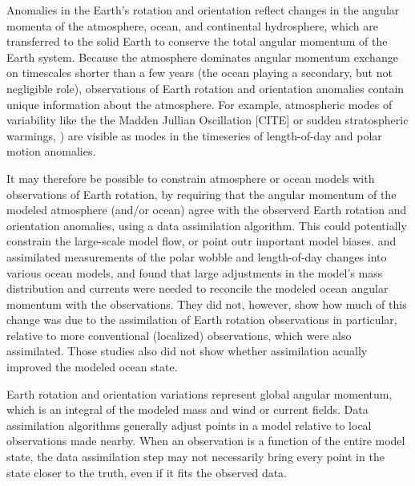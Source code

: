 
Anomalies in the Earth's rotation and orientation reflect changes in the angular momenta of the atmosphere, ocean, and continental hydrosphere, which are transferred to the solid Earth to conserve the total angular momentum of the Earth system. 
Because the atmosphere dominates angular momentum exchange on timescales shorter than a few years (the ocean playing a secondary, but  not negligible role), observations of Earth rotation and orientation anomalies contain unique information about the atmosphere.
For example, atmospheric modes of variability like the the Madden Jullian Oscillation \textcolor{alert}{[CITE]} or sudden stratospheric warmings, \citet{Neef2014}) are visible as modes in the timeseries of length-of-day and polar motion anomalies. 

It may therefore be possible to constrain atmosphere or ocean models with observations of Earth rotation, by requiring that the angular momentum of the modeled atmosphere (and/or ocean) agree with the observerd Earth rotation and orientation anomalies, using a data assimilation algorithm.
This could potentially constrain the large-scale model flow, or point outr important model biases. 
\cite{Saynisch2011,Saynisch2010} and \cite{Saynisch2012} assimilated measurements of the polar wobble and length-of-day changes into various ocean models, and found that large adjustments in the model's mass distribution and currents were needed to reconcile the modeled ocean angular momentum with the observations. 
They did not, however, show how much of this change was due to the assimilation of Earth rotation observations in particular, relative to more conventional (localized) observations, which were also assimilated. 
Those studies also did not show whether assimilation acually improved the modeled ocean state. 

Earth rotation and orientation variations represent global angular momentum, which is an integral of the modeled mass and wind or current fields. 
Data assimilation algorithms generally adjust points in a model relative to local observations made nearby. 
When an observation is a function of the entire model state, the data assimilation step may not necessarily bring every point in the state closer to the truth, even if it fits the observed data. 


